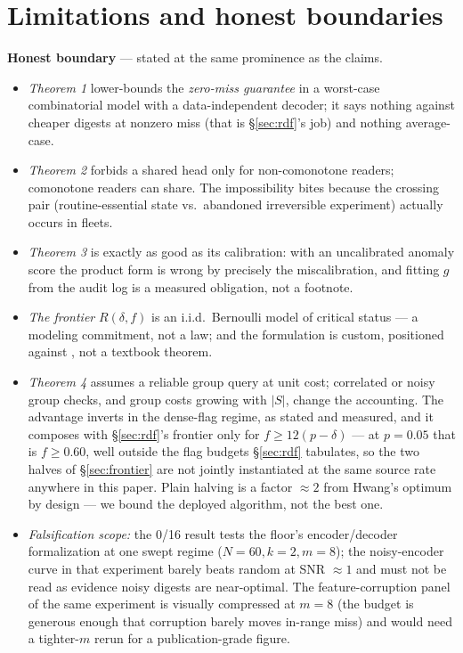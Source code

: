\documentclass[11pt,a4paper]{article}
\begin{document}
\section{Limitations and honest boundaries}\label{sec:limits}
\begin{boundary}
\textbf{Honest boundary} --- stated at the same prominence as the claims.
\begin{itemize}[leftmargin=1.6em]
\item \emph{Theorem 1} lower-bounds the \emph{zero-miss guarantee} in a worst-case combinatorial model with a data-independent decoder; it says nothing against cheaper digests at nonzero miss (that is \S\ref{sec:rdf}'s job) and nothing average-case.
\item \emph{Theorem 2} forbids a shared head only for non-comonotone readers; comonotone readers can share. The impossibility bites because the crossing pair (routine-essential state vs.\ abandoned irreversible experiment) actually occurs in fleets.
\item \emph{Theorem 3} is exactly as good as its calibration: with an uncalibrated anomaly score the product form is wrong by precisely the miscalibration, and fitting $g$ from the audit log is a measured obligation, not a footnote.
\item \emph{The frontier} $R(\delta,f)$ is an i.i.d.\ Bernoulli model of critical status --- a modeling commitment, not a law; and the formulation is custom, positioned against \cite{expansion,rdc}, not a textbook theorem.
\item \emph{Theorem 4} assumes a reliable group query at unit cost; correlated or noisy group checks, and group costs growing with $|S|$, change the accounting. The advantage inverts in the dense-flag regime, as stated and measured, and it composes with \S\ref{sec:rdf}'s frontier only for $f\ge 12(p-\delta)$ --- at $p{=}0.05$ that is $f\ge0.60$, well outside the flag budgets \S\ref{sec:rdf} tabulates, so the two halves of \S\ref{sec:frontier} are not jointly instantiated at the same source rate anywhere in this paper. Plain halving is a factor $\approx2$ from Hwang's optimum by design --- we bound the deployed algorithm, not the best one.
\item \emph{Falsification scope:} the 0/16 result tests the floor's encoder/decoder formalization at one swept regime ($N{=}60,k{=}2,m{=}8$); the noisy-encoder curve in that experiment barely beats random at SNR $\approx1$ and must not be read as evidence noisy digests are near-optimal. The feature-corruption panel of the same experiment is visually compressed at $m{=}8$ (the budget is generous enough that corruption barely moves in-range miss) and would need a tighter-$m$ rerun for a publication-grade figure.
\end{itemize}
\end{boundary}
\end{document}
